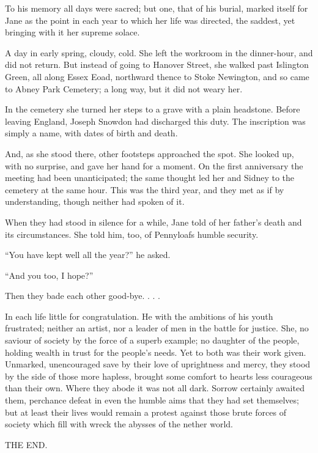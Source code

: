 To his memory all days were sacred; but one, that of his burial, marked
itself for Jane as the point in each year to which her life was
directed, the saddest, yet bringing with it her supreme solace.

A day in early spring, cloudy, cold. She left the workroom in the
dinner-hour, and did not return. But instead of going to Hanover Street,
she walked past Islington Green, all {\protect\hypertarget{309}{}{}}
along Essex Eoad, northward thence to Stoke Newington, and so came to
Abney Park Cemetery; a long way, but it did not weary her.

In the cemetery she turned her steps to a grave with a plain headstone.
Before leaving England, Joseph Snowdon had discharged this duty. The
inscription was simply a name, with dates of birth and death.

And, as she stood there, other footsteps approached the spot. She looked
up, with no surprise, and gave her hand for a moment. On the first
anniversary the meeting had been unanticipated; the same thought led her
and Sidney to the cemetery at the same hour. This was the third year,
and they met as if by understanding, though neither had spoken of it.

When they had stood in silence for a while, Jane told of her father's
death and its circumstances. She told him, too, of Pennyloafs humble
security.

``You have kept well all the year?'' he asked.

``And you too, I hope?''

Then they bade each other good-bye. . . .

In each life little for congratulation. He
{\protect\hypertarget{310}{}{}}with the ambitions of his youth
frustrated; neither an artist, nor a leader of men in the battle for
justice. She, no saviour of society by the force of a superb example; no
daughter of the people, holding wealth in trust for the people's needs.
Yet to both was their work given. Unmarked, unencouraged save by their
love of uprightness and mercy, they stood by the side of those more
hapless, brought some comfort to hearts less courageous than their own.
Where they abode it was not all dark. Sorrow certainly awaited them,
perchance defeat in even the humble aims that they had set themselves;
but at least their lives would remain a protest against those brute
forces of society which fill with wreck the abysses of the nether world.

\vfill
\begin{center}
THE END.
\end{center}
